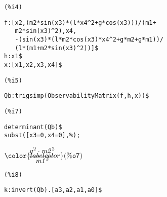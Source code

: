 \noindent
\begin{minipage}[t]{8ex}\color{red}\bf
\begin{verbatim}
(%i4) 
\end{verbatim}
\end{minipage}
\begin{minipage}[t]{\textwidth}\color{blue}
\begin{verbatim}
f:[x2,(m2*sin(x3)*(l*x4^2+g*cos(x3)))/(m1+
   m2*sin(x3)^2),x4,
   -(sin(x3)*(l*m2*cos(x3)*x4^2+g*m2+g*m1))/
   (l*(m1+m2*sin(x3)^2))]$
h:x1$
x:[x1,x2,x3,x4]$
\end{verbatim}
\end{minipage}


\noindent
\begin{minipage}[t]{8ex}\color{red}\bf
\begin{verbatim}
(%i5) 
\end{verbatim}
\end{minipage}
\begin{minipage}[t]{\textwidth}\color{blue}
\begin{verbatim}
Qb:trigsimp(ObservabilityMatrix(f,h,x))$
\end{verbatim}
\end{minipage}


\noindent
\begin{minipage}[t]{8ex}\color{red}\bf
\begin{verbatim}
(%i7) 
\end{verbatim}
\end{minipage}
\begin{minipage}[t]{\textwidth}\color{blue}
\begin{verbatim}
determinant(Qb)$
subst([x3=0,x4=0],%);
\end{verbatim}
\end{minipage}

\noindent
$\displaystyle
\parbox{8ex}{$\color{labelcolor}\mathrm{\tt (\%o7) }\quad $}
\frac{{{g}^{2}}\cdot {{\mathit{m2}}^{2}}}{{{\mathit{m1}}^{2}}}\mbox{}
$


\noindent
\begin{minipage}[t]{8ex}\color{red}\bf
\begin{verbatim}
(%i8) 
\end{verbatim}
\end{minipage}
\begin{minipage}[t]{\textwidth}\color{blue}
\begin{verbatim}
k:invert(Qb).[a3,a2,a1,a0]$
\end{verbatim}
\end{minipage}
